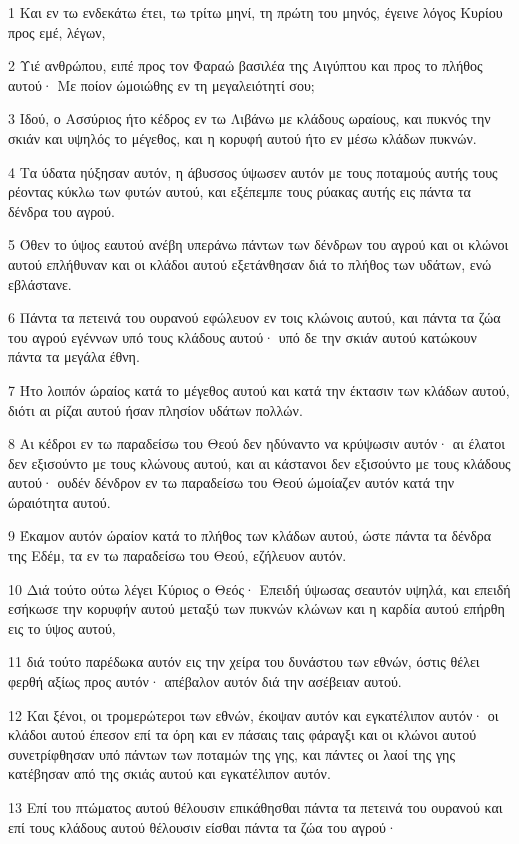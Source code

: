 \par 1 Και εν τω ενδεκάτω έτει, τω τρίτω μηνί, τη πρώτη του μηνός, έγεινε λόγος Κυρίου προς εμέ, λέγων,
\par 2 Υιέ ανθρώπου, ειπέ προς τον Φαραώ βασιλέα της Αιγύπτου και προς το πλήθος αυτού· Με ποίον ώμοιώθης εν τη μεγαλειότητί σου;
\par 3 Ιδού, ο Ασσύριος ήτο κέδρος εν τω Λιβάνω με κλάδους ωραίους, και πυκνός την σκιάν και υψηλός το μέγεθος, και η κορυφή αυτού ήτο εν μέσω κλάδων πυκνών.
\par 4 Τα ύδατα ηύξησαν αυτόν, η άβυσσος ύψωσεν αυτόν με τους ποταμούς αυτής τους ρέοντας κύκλω των φυτών αυτού, και εξέπεμπε τους ρύακας αυτής εις πάντα τα δένδρα του αγρού.
\par 5 Όθεν το ύψος εαυτού ανέβη υπεράνω πάντων των δένδρων του αγρού και οι κλώνοι αυτού επλήθυναν και οι κλάδοι αυτού εξετάνθησαν διά το πλήθος των υδάτων, ενώ εβλάστανε.
\par 6 Πάντα τα πετεινά του ουρανού εφώλευον εν τοις κλώνοις αυτού, και πάντα τα ζώα του αγρού εγέννων υπό τους κλάδους αυτού· υπό δε την σκιάν αυτού κατώκουν πάντα τα μεγάλα έθνη.
\par 7 Ήτο λοιπόν ώραίος κατά το μέγεθος αυτού και κατά την έκτασιν των κλάδων αυτού, διότι αι ρίζαι αυτού ήσαν πλησίον υδάτων πολλών.
\par 8 Αι κέδροι εν τω παραδείσω του Θεού δεν ηδύναντο να κρύψωσιν αυτόν· αι έλατοι δεν εξισούντο με τους κλώνους αυτού, και αι κάστανοι δεν εξισούντο με τους κλάδους αυτού· ουδέν δένδρον εν τω παραδείσω του Θεού ώμοίαζεν αυτόν κατά την ώραιότητα αυτού.
\par 9 Έκαμον αυτόν ώραίον κατά το πλήθος των κλάδων αυτού, ώστε πάντα τα δένδρα της Εδέμ, τα εν τω παραδείσω του Θεού, εζήλευον αυτόν.
\par 10 Διά τούτο ούτω λέγει Κύριος ο Θεός· Επειδή ύψωσας σεαυτόν υψηλά, και επειδή εσήκωσε την κορυφήν αυτού μεταξύ των πυκνών κλώνων και η καρδία αυτού επήρθη εις το ύψος αυτού,
\par 11 διά τούτο παρέδωκα αυτόν εις την χείρα του δυνάστου των εθνών, όστις θέλει φερθή αξίως προς αυτόν· απέβαλον αυτόν διά την ασέβειαν αυτού.
\par 12 Και ξένοι, οι τρομερώτεροι των εθνών, έκοψαν αυτόν και εγκατέλιπον αυτόν· οι κλάδοι αυτού έπεσον επί τα όρη και εν πάσαις ταις φάραγξι και οι κλώνοι αυτού συνετρίφθησαν υπό πάντων των ποταμών της γης, και πάντες οι λαοί της γης κατέβησαν από της σκιάς αυτού και εγκατέλιπον αυτόν.
\par 13 Επί του πτώματος αυτού θέλουσιν επικάθησθαι πάντα τα πετεινά του ουρανού και επί τους κλάδους αυτού θέλουσιν είσθαι πάντα τα ζώα του αγρού·
